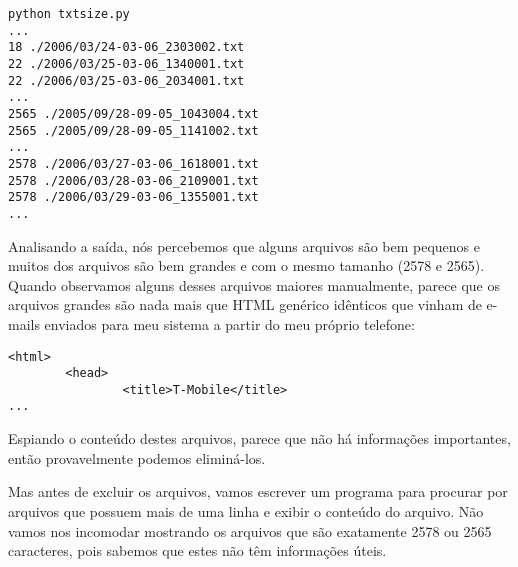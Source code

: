 \beforeverb
\begin{verbatim}
python txtsize.py
...
18 ./2006/03/24-03-06_2303002.txt
22 ./2006/03/25-03-06_1340001.txt
22 ./2006/03/25-03-06_2034001.txt
...
2565 ./2005/09/28-09-05_1043004.txt
2565 ./2005/09/28-09-05_1141002.txt
...
2578 ./2006/03/27-03-06_1618001.txt
2578 ./2006/03/28-03-06_2109001.txt
2578 ./2006/03/29-03-06_1355001.txt
...
\end{verbatim}
\afterverb

Analisando a saída, nós percebemos que alguns arquivos são bem pequenos e muitos dos arquivos são bem grandes e com o mesmo tamanho (2578 e 2565). Quando observamos alguns desses arquivos maiores manualmente, parece que os arquivos grandes são nada mais que HTML genérico idênticos que vinham de e-mails enviados para meu sistema a partir do meu próprio telefone:

\beforeverb
\begin{verbatim}
<html>
        <head>
                <title>T-Mobile</title>
...
\end{verbatim}
\afterverb

Espiando o conteúdo destes arquivos, parece que não há informações importantes, então provavelmente podemos eliminá-los.

Mas antes de excluir os arquivos, vamos escrever um programa para procurar por arquivos que possuem mais de uma linha  e exibir o conteúdo do arquivo. 
Não vamos nos incomodar mostrando os arquivos que são exatamente 2578 ou 2565 caracteres, pois sabemos que estes não têm informações úteis.

